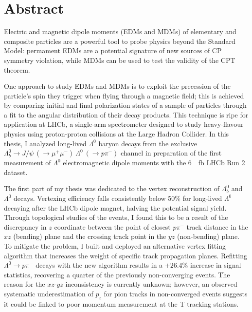 \documentclass[12pt,a4paper]{book}
\renewcommand{\chaptermark}[1]{\markboth{#1}{}}
\newcommand{\demonstratorfull}{$\Lambda_b^0 \rightarrow J/\psi~(\rightarrow \mu^+ \mu^-)~\Lambda^0~(\rightarrow p\pi^-)$\xspace}
\newcommand{\lz}{$\Lambda^0$\xspace}
\newcommand{\lbz}{$\Lambda_b^0$\xspace}
\newcommand{\lambdadecay}{$\Lambda^0 \rightarrow p\pi^-$\xspace}
\begin{document}





\mainmatter

\chapter*{Abstract}

Electric and magnetic dipole moments (EDMs and MDMs) of elementary and composite particles are a powerful tool to probe physics beyond the Standard Model:
permament EDMs are a potential signature of new sources of CP symmetry violation, while MDMs can be used to test the validity of the CPT theorem.

One approach to study EDMs and MDMs is to exploit the precession of the particle's spin they trigger when flying through a magnetic field;
this is achieved by comparing initial and final polarization states of a sample of particles through a fit to the angular distribution of their decay products.
This technique is ripe for application at LHCb, a single-arm spectrometer designed to study heavy-flavour physics using proton-proton collisions at the Large Hadron Collider.
In this thesis, I analyzed long-lived \lz baryon decays from the exclusive \demonstratorfull channel in preparation of the first measurement of \lz electromagnetic dipole moments with the \SI{6}{\per\femto\barn} LHCb Run 2 dataset.

The first part of my thesis was dedicated to the vertex reconstruction of \lbz and \lz decays.
Vertexing efficiency falls consistently below 50\% for long-lived \lz decaying after the LHCb dipole magnet, halving the potential signal yield.
Through topological studies of the events, I found this to be a result of the discrepancy in $z$ coordinate between the point of closest $p\pi^-$ track distance in the $xz$ (bending) plane and the crossing track point in the $yz$ (non-bending) plane.
To mitigate the problem, I built and deployed an alternative vertex fitting algorithm that increases the weight of specific track propagation planes.
Refitting \lambdadecay decays with the new algorithm results in a $+26.4\%$ increase in signal statistics, recovering a quarter of the previously non-converging events.
The reason for the $xz$-$yz$ inconsistency is currently unknown;
however, an observed systematic underestimation of $p_z$ for pion tracks in non-converged events suggests it could be linked to poor momentum measurement at the T tracking stations.
\end{document}
